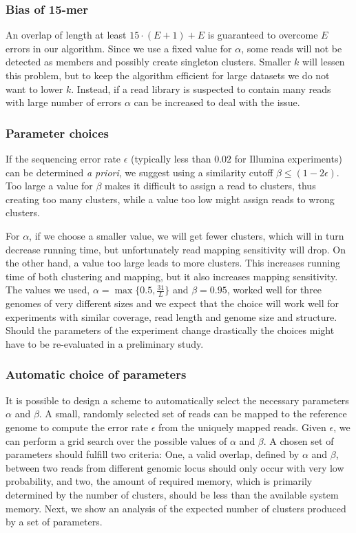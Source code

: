 \documentclass[a4paper]{article}
\begin{document}
\subsubsection*{Bias of 15-mer} 
An overlap of length at least $15\cdot(E+1)+E$ 
is guaranteed to overcome $E$ errors in our algorithm. Since we use a
fixed value for $\alpha$, some reads will not be detected as members and
possibly create singleton clusters. Smaller $k$ will lessen this problem,
but to keep the algorithm efficient for large datasets we do not want
to lower $k$. Instead, if a read library is suspected to contain many
reads with large number of errors $\alpha$ can be increased to deal with
the issue.

\subsubsection*{Parameter choices} 
\label{sec:params}
If the sequencing error rate $\epsilon$
(typically less than $0.02$ for Illumina experiments) can be determined 
\emph{a priori}, 
we suggest using a similarity cutoff $\beta \le (1-2\epsilon)$. Too 
large a value for $\beta$ makes it difficult to assign a read to clusters, 
thus creating too many clusters,
while a value too low might assign reads to wrong clusters. 

For $\alpha$, if we choose a smaller value, we will get fewer clusters,
which will in turn decrease running time, but unfortunately read mapping 
sensitivity will drop. On the other hand, a value too large leads to more
clusters. This increases running time of both clustering and mapping,
but it also increases mapping sensitivity. The values we used,
$\alpha=\max\{0.5, \frac{31}{L}\}$ and $\beta=0.95$, worked well for 
three genomes of very
different sizes and we expect that the choice will work well for
experiments with similar coverage, read length and genome size and
structure. Should the parameters of the experiment change drastically
the choices might have to be re-evaluated in a preliminary study.


\subsubsection*{Automatic choice of parameters} It is possible to design
a scheme to automatically select the necessary parameters $\alpha$ and
$\beta$.  
A small, randomly selected set of reads can be mapped to the reference 
genome to compute the error rate $\epsilon$ from the uniquely mapped reads.
Given $\epsilon$, we can perform a grid search over the possible
values of $\alpha$ and $\beta$. 
A chosen set of parameters should fulfill
two criteria: One, a valid overlap, defined by $\alpha$ and $\beta$,
between two reads from different genomic locus
should only occur with very low probability, 
and two, the amount of required memory,
which is primarily determined by the number of clusters, should be less
than the available system memory. Next, we show an analysis of the 
expected number of clusters produced by a set of parameters. 
\end{document}
